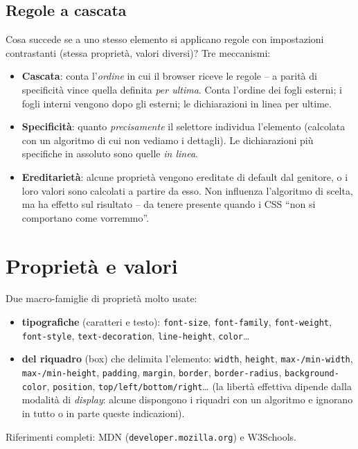 \subsection{Regole a cascata}
Cosa succede se a uno stesso elemento si applicano regole con impostazioni contrastanti
(stessa propriet\`a, valori diversi)? Tre meccanismi:
\begin{itemize}
  \item \textbf{Cascata}: conta l'\emph{ordine} in cui il browser riceve le regole -- a
        parit\`a di specificit\`a vince quella definita \emph{per ultima}. Conta l'ordine dei
        fogli esterni; i fogli interni vengono dopo gli esterni; le dichiarazioni in linea
        per ultime.
  \item \textbf{Specificit\`a}: quanto \emph{precisamente} il selettore individua l'elemento
        (calcolata con un algoritmo di cui non vediamo i dettagli). Le dichiarazioni pi\`u
        specifiche in assoluto sono quelle \emph{in linea}.
  \item \textbf{Ereditariet\`a}: alcune propriet\`a vengono ereditate di default dal
        genitore, o i loro valori sono calcolati a partire da esso. Non influenza l'algoritmo
        di scelta, ma ha effetto sul risultato -- da tenere presente quando i CSS ``non si
        comportano come vorremmo''.
\end{itemize}

\section{Propriet\`a e valori}

Due macro-famiglie di propriet\`a molto usate:
\begin{itemize}
  \item \textbf{tipografiche} (caratteri e testo): \texttt{font-size}, \texttt{font-family},
        \texttt{font-weight}, \texttt{font-style}, \texttt{text-decoration},
        \texttt{line-height}, \texttt{color}\dots
  \item \textbf{del riquadro} (box) che delimita l'elemento: \texttt{width}, \texttt{height},
        \texttt{max-/min-width}, \texttt{max-/min-height}, \texttt{padding},
        \texttt{margin}, \texttt{border}, \texttt{border-radius},
        \texttt{background-color}, \texttt{position}, \texttt{top/left/bottom/right}\dots
        (la libert\`a effettiva dipende dalla modalit\`a di \emph{display}: alcune
        dispongono i riquadri con un algoritmo e ignorano in tutto o in parte queste
        indicazioni).
\end{itemize}
Riferimenti completi: MDN (\texttt{developer.mozilla.org}) e W3Schools.

